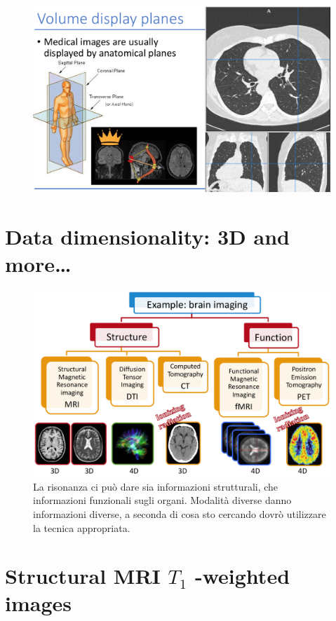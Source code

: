 
\begin{figure}[ht]
	\centering
	\includegraphics[width=0.8\linewidth]{figure_med/vdp}
\end{figure}
\FloatBarrier

\section{Data dimensionality: 3D and more…}

\begin{figure}[ht]
	\centering
	\includegraphics[width=0.9\linewidth]{figure_med/data_dim}
	\caption{La risonanza ci può dare sia informazioni strutturali, che informazioni funzionali sugli organi. Modalità diverse danno informazioni diverse, a seconda di cosa sto cercando dovrò utilizzare la tecnica appropriata. }
\end{figure}
\FloatBarrier 

\section{Structural MRI $T_1$ -weighted images}

